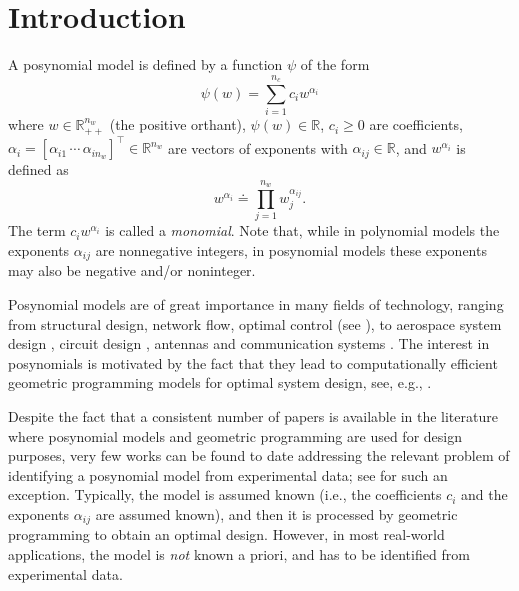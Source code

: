 \documentclass[11pt]{article}
\newcommand{\tran}{^{\top}}
\begin{document}
\section{Introduction}

A posynomial model is defined by a function $\psi$ of the form 
\begin{equation}
\psi(w)=\sum_{i=1}^{n_{c}}c_{i}w^{\alpha_{i}}\label{eq:pp0}
\end{equation}
where $w\in\mathbb{R}_{++}^{n_{w}}$ (the positive orthant), $\psi(w)\in\mathbb{R}$,
$c_{i}\geq0$ are coefficients, $\alpha_{i}=[\alpha_{i1}\,\cdots\,\alpha_{in_{w}}]\tran\in\mathbb{R}^{n_{w}}$
are vectors of exponents with $\alpha_{ij}\in\mathbb{R}$, and $w^{\alpha_{i}}$
is defined as 
\[
w^{\alpha_{i}}\doteq\prod_{j=1}^{n_{w}}w_{j}^{\alpha_{ij}}.
\]
The term $c_{i}w^{\alpha_{i}}$ is called a {\em monomial}. Note that, while
in polynomial models the exponents $\alpha_{ij}$ are nonnegative
integers, in posynomial models these exponents may also be negative
and/or noninteger.

Posynomial models are of great importance in many fields of technology,
ranging from structural design, network flow, optimal control (see
\cite{BePh76,Wilde78}), to aerospace system design \cite{HoAb12},
circuit design \cite{bkph05,DaGiSa03,SaRaVaKa93}, antennas \cite{BaLaDoHa10}
and communication systems \cite{Chiang05}. The interest in posynomials
is motivated by the fact that they lead to computationally efficient
geometric programming models for optimal system design, see, e.g.,
\cite{gp_67,BePh76,Wilde78}.

Despite the fact that a  consistent number of papers is available in the literature
where posynomial models and geometric programming are used for design
purposes, very few works can be found to date addressing the relevant problem
of identifying a posynomial model from experimental data; see \cite{DaGiSa03}
for such an exception. Typically, the model is  assumed known (i.e.,
the coefficients $c_{i}$ and the exponents $\alpha_{ij}$ are assumed
known), and then it is processed by  geometric programming to obtain an optimal design.
However, in most real-world applications, the model is {\em not}
known a priori, and has to be identified from experimental data.
\end{document}
